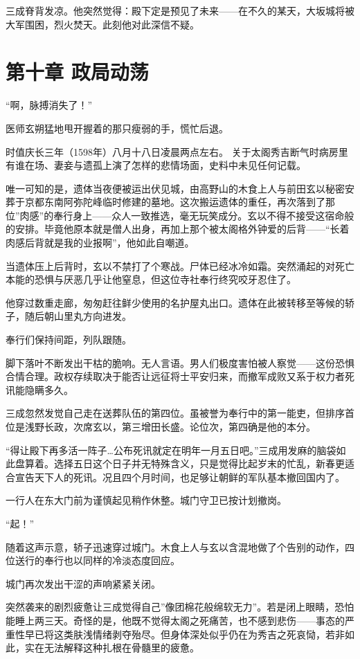 \documentclass[
]{article}
\begin{document}
三成脊背发凉。他突然觉得：殿下定是预见了未来------在不久的某天，大坂城将被大军围困，烈火焚天。此刻他对此深信不疑。

\section*{第十章 政局动荡}\label{ux7b2cux5341ux7ae0-ux653fux5c40ux52a8ux8361}

``啊，脉搏消失了！''

医师玄朔猛地甩开握着的那只瘦弱的手，慌忙后退。

时值庆长三年（1598年）八月十八日凌晨两点左右。 关于太阁秀吉断气时病房里有谁在场、妻妾与遗孤上演了怎样的悲情场面，史料中未见任何记载。

唯一可知的是，遗体当夜便被运出伏见城，由高野山的木食上人与前田玄以秘密安葬于京都东南阿弥陀峰临时修建的墓地。这次搬运遗体的重任，再次落到了那位''肉感''的奉行身上------众人一致推选，毫无玩笑成分。玄以不得不接受这宿命般的安排。毕竟他原本就是僧人出身，再加上那个被太阁格外钟爱的后背------``长着肉感后背就是我的业报啊''，他如此自嘲道。

当遗体压上后背时，玄以不禁打了个寒战。尸体已经冰冷如霜。突然涌起的对死亡本能的恐惧与厌恶几乎让他窒息，但这位寺社奉行终究咬牙忍住了。

他穿过数重走廊，匆匆赶往鲜少使用的名护屋丸出口。遗体在此被转移至等候的轿子，随后朝山里丸方向进发。

奉行们保持间距，列队跟随。

脚下落叶不断发出干枯的脆响。无人言语。男人们极度害怕被人察觉------这份恐惧合情合理。政权存续取决于能否让远征将士平安归来，而撤军成败又系于权力者死讯能隐瞒多久。

三成忽然发觉自己走在送葬队伍的第四位。虽被誉为奉行中的第一能吏，但排序首位是浅野长政，次席玄以，第三增田长盛。论位次，第四确是他的本分。

``得让殿下再多活一阵子\ldots 公布死讯就定在明年一月五日吧。''三成用发麻的脑袋如此盘算着。选择五日这个日子并无特殊含义，只是觉得比起岁末的忙乱，新春更适合宣告天下人的死讯。况且四个月时间，也足够让朝鲜的军队基本撤回国内了。

一行人在东大门前为谨慎起见稍作休整。城门守卫已按计划撤岗。

``起！''

随着这声示意，轿子迅速穿过城门。木食上人与玄以含混地做了个告别的动作，四位送行的奉行也以同样的冷淡态度回应。

城门再次发出干涩的声响紧紧关闭。

突然袭来的剧烈疲惫让三成觉得自己''像团棉花般绵软无力''。若是闭上眼睛，恐怕能睡上两三天。奇怪的是，他既不觉得太阁之死痛苦，也不感到悲伤------事态的严重性早已将这类肤浅情绪剥夺殆尽。但身体深处似乎仍在为秀吉之死哀恸，若非如此，实在无法解释这种扎根在骨髓里的疲惫。
\end{document}
